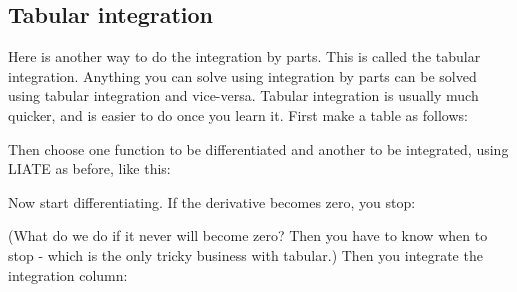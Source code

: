 \documentclass[12pt]{report}
\begin{document}
\begin{appendices}
	\subsection*{Tabular integration}
	Here is another way to do the integration by parts. This is called the tabular integration. Anything you can solve using integration by parts can be solved using tabular integration and vice-versa. Tabular integration is usually much quicker, and is easier to do once you learn it. First make a table as follows:
	\begin{center}  \end{center}
	Then choose one function to be differentiated and another to be integrated, using LIATE as before, like this:
	\begin{center}  \end{center}
	Now start differentiating. If the derivative becomes zero, you stop:
	\begin{center}  \end{center}
	(What do we do if it never will become zero? Then you have to know when to stop - which is the only tricky business with tabular.)
	Then you integrate the integration column:

\end{appendices}
\end{document}
